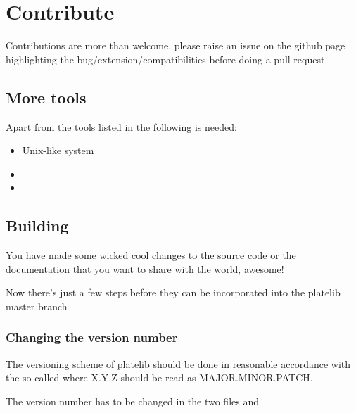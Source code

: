 \documentclass[letterpaper,10pt,english]{sphinxmanual}
\begin{document}
\chapter{Contribute}
\label{\detokenize{contribute:contribute}}\label{\detokenize{contribute::doc}}
Contributions are more than welcome, please raise an issue on the github page
highlighting the bug/extension/compatibilities before doing a pull request.


\section{More tools}
\label{\detokenize{contribute:more-tools}}
Apart from the tools listed in {\hyperref[\detokenize{install:installation}]{}} the following is needed:
\begin{itemize}
\item {} 
Unix-like system

\item {} 

\item {} 

\end{itemize}


\section{Building}
\label{\detokenize{contribute:building}}\label{\detokenize{contribute:git}}
You have made some wicked cool changes to the source code
or the documentation that you want to share with the world, awesome!

Now there’s just a few steps before they can be incorporated into
the platelib master branch


\subsection{Changing the version number}
\label{\detokenize{contribute:changing-the-version-number}}
The versioning scheme of platelib should be done in reasonable
accordance with the so called  where
X.Y.Z should be read as MAJOR.MINOR.PATCH.

The version number has to be changed in the two files  and
\end{document}

